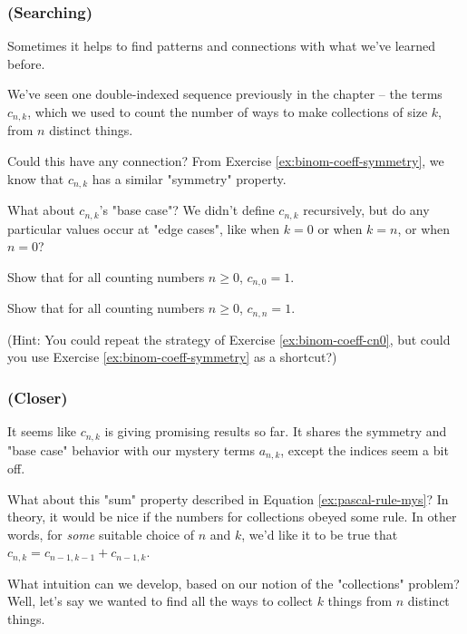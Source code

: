 \subsubsection{(Searching)} 

Sometimes it helps to find patterns and connections with what we've learned before. 

We've seen one double-indexed sequence previously in the chapter -- the terms $c_{n,k}$, which we used to count the number of ways to make collections of size $k$, from $n$ distinct things.

Could this have any connection? From Exercise \ref{ex:binom-coeff-symmetry}, we know that $c_{n,k}$ has a similar "symmetry" property. 

What about $c_{n,k}$'s "base case"? We didn't define $c_{n,k}$ recursively, but do any particular values occur at "edge cases", like when $k = 0$ or when $k = n$, or when $n = 0$?

\begin{exercise}
\label{ex:binom-coeff-cn0}
Show that for all counting numbers $n \geq 0$, $c_{n,0} = 1$.
\end{exercise}

\begin{exercise}
Show that for all counting numbers $n \geq 0$, $c_{n,n} = 1$.

(Hint: You could repeat the strategy of Exercise \ref{ex:binom-coeff-cn0}, but could you use Exercise \ref{ex:binom-coeff-symmetry} as a shortcut?)
\end{exercise}


\subsubsection{(Closer)} 

It seems like $c_{n,k}$ is giving promising results so far. It shares the symmetry and "base case" behavior with our mystery terms $a_{n,k}$, except the indices seem a bit off.


What about this "sum" property described in Equation \ref{ex:pascal-rule-mys}? In theory, it would be nice if the numbers for collections obeyed some rule. In other words, for \emph{some} suitable choice of $n$ and $k$, we'd like it to be true that $c_{n,k} = c_{n-1,k-1} + c_{n-1,k}$.

What intuition can we develop, based on our notion of the "collections" problem? Well, let's say we wanted to find all the ways to collect $k$ things from $n$ distinct things. 

